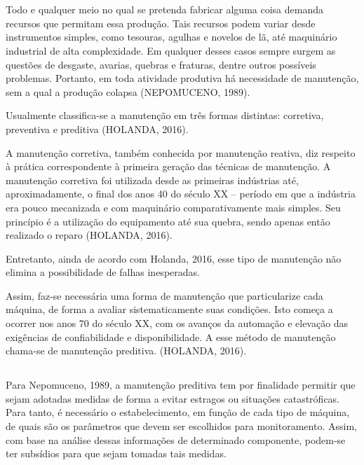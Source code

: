 \documentclass[
	12pt,				
	oneside,			
	a4paper,			
	english,			
	brazil,	
	sumario=abnt-6027-2012		
	]{abntex2ppgsi}
\begin{document}
\section{}
Todo e qualquer meio no qual se pretenda fabricar alguma coisa demanda recursos que permitam essa produção. Tais recursos podem variar desde instrumentos simples, como tesouras, agulhas e novelos de lã, até maquinário industrial de alta complexidade. Em qualquer desses casos sempre surgem as questões de desgaste, avarias, quebras e fraturas, dentre outros possíveis problemas. Portanto, em toda atividade produtiva  há necessidade de manutenção, sem a qual a produção colapsa (NEPOMUCENO, 1989).

	Usualmente classifica-se a manutenção em três formas distintas: corretiva, preventiva e preditiva (HOLANDA, 2016). 

	A manutenção corretiva, também conhecida por manutenção reativa, diz respeito à prática correspondente à primeira geração das técnicas de manutenção. A manutenção corretiva foi utilizada desde as primeiras indústrias até, aproximadamente, o final dos anos 40 do século XX – período em que a indústria era pouco mecanizada e com maquinário comparativamente mais simples. Seu princípio é a utilização do equipamento até sua quebra, sendo apenas então realizado o reparo (HOLANDA, 2016). 
	
Entretanto, ainda de acordo com Holanda, 2016, esse tipo de manutenção não elimina a possibilidade de falhas inesperadas.

Assim, faz-se necessária uma forma de manutenção que particularize cada máquina, de forma a avaliar sistematicamente suas condições. Isto começa a ocorrer nos anos 70 do século XX, com os avanços da automação e elevação das exigências de confiabilidade e disponibilidade. A esse método de manutenção chama-se de manutenção preditiva. (HOLANDA, 2016).  

\subsection{}

Para Nepomuceno, 1989, a manutenção preditiva tem por finalidade permitir que sejam adotadas medidas de forma a evitar estragos ou situações catastróficas. Para tanto, é necessário o estabelecimento, em função de cada tipo de máquina, de quais são os parâmetros que devem ser escolhidos para monitoramento. Assim, com base na análise dessas informações de determinado componente, podem-se ter subsídios para que sejam tomadas tais medidas. 
\end{document}
